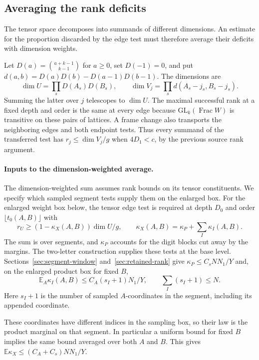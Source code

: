 \subsection{Averaging the rank deficits}

The tensor space decomposes into summands of different dimensions. An estimate for the proportion discarded by the edge test must therefore average their deficits with dimension weights.

Let \(D(a)=\binom{a+k-1}{k-1}\) for \(a\ge0\), set
\(D(-1)=0\), and put
\(d(a,b)=D(a)D(b)-D(a-1)D(b-1)\).
The dimensions are \[
 \dim U=\prod_s D(A_s)D(B_s),\qquad \dim V_j=\prod_s d(A_s-j_s,B_s-j_s).
\]
Summing the latter over \(j\) telescopes to \(\dim U\).
The maximal successful rank at a fixed depth and order is
the same at every edge because \(\mathrm{GL}_k(\operatorname{Frac}W)\)
is transitive on these pairs of lattices. A frame change also
transports the neighboring edges and both endpoint tests.
Thus every summand of the transferred test has
\(r_j\le\dim V_j/g\) when \(4D_1<c\), by the previous
source rank argument.

\paragraph{Inputs to the dimension-weighted average.}
The dimension-weighted sum assumes rank bounds on its tensor constituents. We specify which sampled segment tests supply them on the enlarged box. For the enlarged weight box
below, the tensor edge test is required at depth \(D_0\)
and order \(\lfloor t_0(A,B)\rfloor\) with
\begin{equation}\label{eq:two-letter-tensor-rank}
 r_U\ge (1-\kappa_X(A,B))\dim U/g,\qquad
 \kappa_X(A,B)=\kappa_P+\sum_I\kappa_I(A,B).
\end{equation}
The sum is over segments, and \(\kappa_P\) accounts for the
digit blocks cut away by the margins. The two-letter construction supplies these tests at the base level.
Sections~\ref{sec:segment-window} and~\ref{sec:retained-rank} give \(\kappa_P\le C_s NN_1/Y\)
and, on the enlarged product box for fixed \(B\),
\[
 \mathbb E_A\kappa_I(A,B)
      \le C_A (s_I+1)N_1/Y,\qquad \sum_I(s_I+1)\le N.
\]
Here \(s_I+1\) is the number of sampled \(A\)-coordinates in
the segment, including its appended coordinate.

These coordinates have different indices in the sampling box, so their law is the
product marginal on that segment. In particular a uniform
bound for fixed \(B\) implies the same bound averaged over
both \(A\) and \(B\). This gives
\(\mathbb E\kappa_X\le(C_A+C_s)NN_1/Y\).

